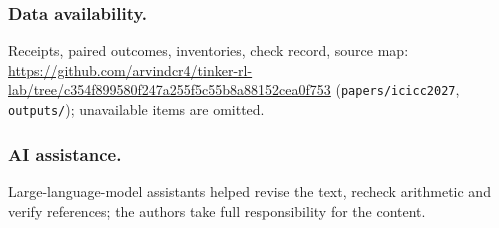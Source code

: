 \documentclass[a4paper,runningheads]{llncs}
\begin{document}
\begin{credits}
\subsubsection{Data availability.} Receipts, paired outcomes, inventories,
check record, source map:
\url{https://github.com/arvindcr4/tinker-rl-lab/tree/c354f899580f247a255f5c55b8a88152cea0f753}
(\texttt{papers/icicc2027}, \texttt{outputs/}); unavailable items
are omitted.
\subsubsection{AI assistance.} Large-language-model assistants helped revise
the text, recheck arithmetic and verify references; the authors take full
responsibility for the content.
\end{credits}


\end{document}
